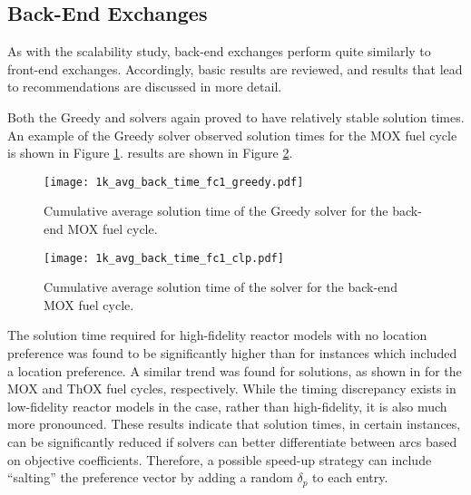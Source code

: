 \subsection{Back-End Exchanges}

As with the scalability study, back-end exchanges perform quite similarly to
front-end exchanges. Accordingly, basic results are reviewed, and results that
lead to recommendations are discussed in more detail.


Both the Greedy and \clp solvers again proved to have relatively stable solution
times. An example of the Greedy solver observed solution times for the MOX fuel
cycle is shown in Figure \ref{fig:1k_avg_back_time_fc1_greedy}. \clp results are
shown in Figure \ref{fig:1k_avg_back_time_fc1_clp}. 

\begin{figure}[h!]
  \begin{center}
    \texttt{[image: 1k\_avg\_back\_time\_fc1\_greedy.pdf]}
    \caption{
      \label{fig:1k_avg_back_time_fc1_greedy}
      Cumulative average solution time of the Greedy solver for the back-end MOX
      fuel cycle.}
  \end{center}
\end{figure}

\begin{figure}[h!]
  \begin{center}
    \texttt{[image: 1k\_avg\_back\_time\_fc1\_clp.pdf]}
    \caption{
      \label{fig:1k_avg_back_time_fc1_clp}
      Cumulative average solution time of the \clp solver for the back-end MOX
      fuel cycle.}
  \end{center}
\end{figure}

The \clp solution time required for high-fidelity reactor models with no location
preference was found to be significantly higher than for instances which
included a location preference. A similar trend was found for \cbc solutions, as
shown in  for
the MOX and ThOX fuel cycles, respectively. While the timing discrepancy exists
in low-fidelity reactor models in the \cbc case, rather than high-fidelity, it is
also much more pronounced. These results indicate that solution times, in
certain instances, can be significantly reduced if solvers can better
differentiate between arcs based on objective coefficients. Therefore, a
possible speed-up strategy can include ``salting'' the preference vector by
adding a random $\delta_p$ to each entry.

